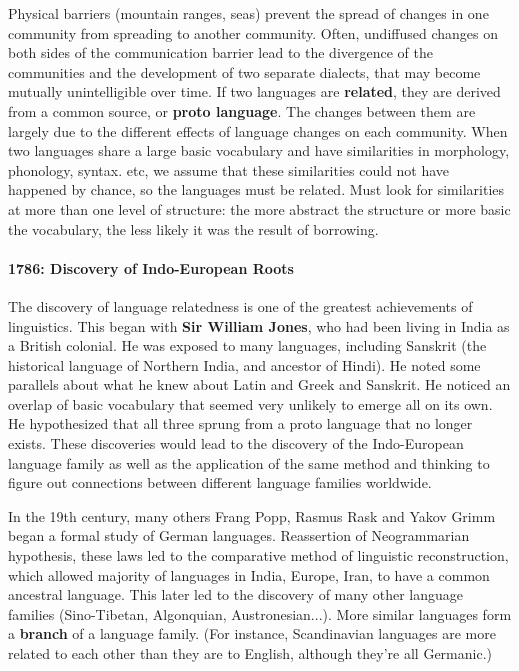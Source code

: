 \documentclass{exam}
\begin{document}
Physical barriers (mountain ranges, seas) prevent the spread of changes in one community from spreading to another community. Often, undiffused changes on both sides of the communication barrier lead to the divergence of the communities and the development of two separate dialects, that may become mutually unintelligible over time. If two languages are \textbf{related}, they are derived from a common source, or \textbf{proto language}. The changes between them are largely due to the different effects of language changes on each community. When two languages share a large basic vocabulary and have similarities in morphology, phonology, syntax. etc, we assume that these similarities could not have happened by chance, so the languages must be related. Must look for similarities at more than one level of structure: the more abstract the structure or more basic the vocabulary, the less likely it was the result of borrowing. 

\paragraph{1786: Discovery of Indo-European Roots} The discovery of language relatedness is one of the greatest achievements of linguistics. This began with \textbf{Sir William Jones}, who had been living in India as a British colonial. He was exposed to many languages, including Sanskrit (the historical language of Northern India, and ancestor of Hindi). He noted some parallels about what he knew about Latin and Greek and Sanskrit. He noticed an overlap of basic vocabulary that seemed very unlikely to emerge all on its own. He hypothesized that all three sprung from a proto language that no longer exists. These discoveries would lead to the discovery of the Indo-European language family as well as the application of the same method and thinking to figure out connections between different language families worldwide. 

In the 19th century, many others Frang Popp, Rasmus Rask and Yakov Grimm began a formal study of German languages. Reassertion of Neogrammarian hypothesis, these laws led to the comparative method of linguistic reconstruction, which allowed majority of languages in India, Europe, Iran, to have a common ancestral language. This later led to the discovery of many other language families (Sino-Tibetan, Algonquian, Austronesian...). More similar languages form a \textbf{branch} of a language family. (For instance, Scandinavian languages are more related to each other than they are to English, although they're all Germanic.)
\end{document}
